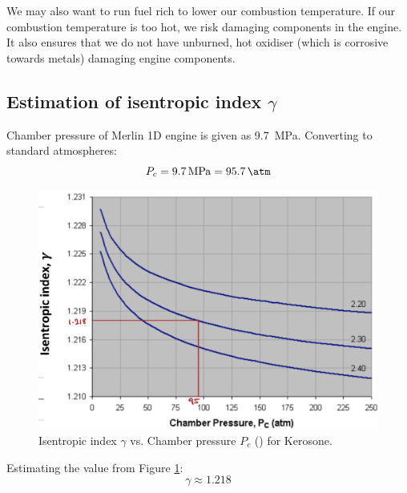 \documentclass[11pt]{article}
\numberwithin{equation}{section}
\begin{document}
We may also want to run fuel rich to lower our combustion temperature. If our combustion temperature is too hot, we risk damaging components in the engine. It also ensures that we do not have unburned, hot oxidiser (which is corrosive towards metals) damaging engine components.
\subsection{Estimation of isentropic index $\gamma$}
Chamber pressure of Merlin 1D engine is given as \SI{9.7}{\mega\pascal}. Converting to standard atmospheres:
\begin{equation}
    P_c = \SI{9.7}{\mega\pascal} = \SI{95.7}{\atm}
\end{equation}
\begin{figure}[H]
    \centering
    \includegraphics[height = 50ex]{./img/isentropicIndex.png}
    \caption{Isentropic index $\gamma$ vs. Chamber pressure $P_c$ (\si{\atm}) for Kerosone.}
    \label{isentropicIndex}
\end{figure}
Estimating the value from Figure \ref{isentropicIndex}:
\begin{equation}
    \gamma \approx 1.218
\end{equation}
\end{document}
